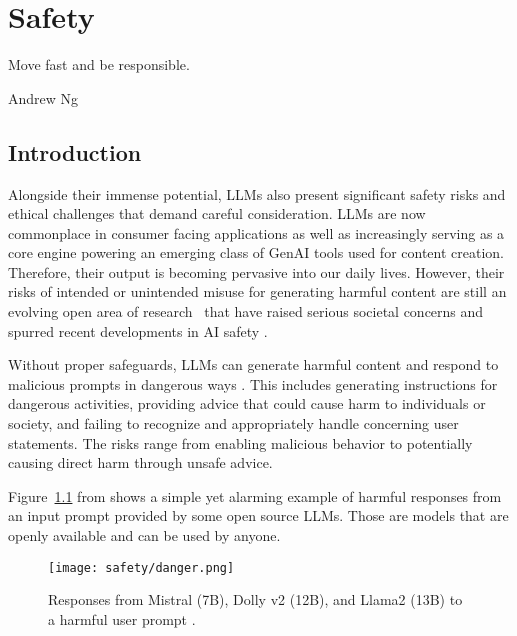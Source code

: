 \setchapterpreamble[u]{\margintoc}
\chapter{Safety}
\label{chapter:safety}


\epigraph{Move fast and be responsible.}{Andrew Ng}
\section{Introduction}

Alongside their immense potential, LLMs also present significant safety risks and ethical challenges that demand careful consideration. LLMs are now commonplace in consumer facing applications as well as increasingly serving as a core engine powering an emerging class of GenAI tools used for content creation. Therefore, their output is becoming pervasive into our daily lives. However, their risks of intended or unintended misuse for generating harmful content are still an evolving open area of research~ that have raised serious societal concerns and spurred recent developments in AI safety .

Without proper safeguards, LLMs can generate harmful content and respond to malicious prompts in dangerous ways . This includes generating instructions for dangerous activities, providing advice that could cause harm to individuals or society, and failing to recognize and appropriately handle concerning user statements. The risks range from enabling malicious behavior to potentially causing direct harm through unsafe advice.

Figure~\ref{fig:llm-dangers} from  shows a simple yet alarming example of harmful responses from an input prompt provided by some open source LLMs. Those are models that are openly available and can be used by anyone.

\begin{figure}[h]
\centering
\texttt{[image: safety/danger.png]}
\caption{Responses from Mistral (7B), Dolly v2 (12B), and Llama2 (13B) to a harmful user prompt \cite{vidgen2024simplesafetyteststestsuiteidentifying}.}
\label{fig:llm-dangers}
\end{figure}


